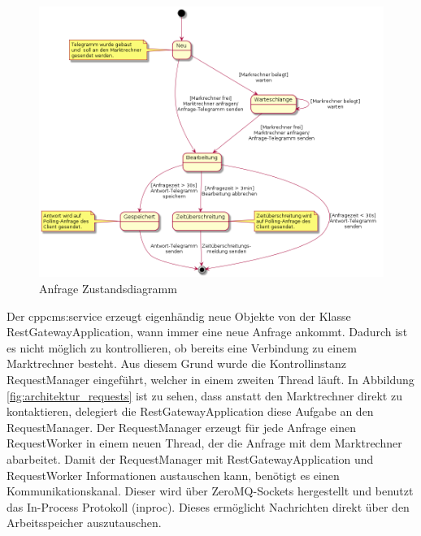 \documentclass{article}
\begin{document}
\begin{figure}[h]
\centering
\includegraphics[scale=0.4]{praktikumsbericht_002.png}
\caption{Anfrage Zustandsdiagramm}
\label{fig:request_state}
\end{figure}

Der cppcms:service erzeugt eigenhändig neue Objekte von der Klasse RestGatewayApplication, wann immer eine neue Anfrage ankommt. Dadurch ist es nicht möglich zu kontrollieren, ob bereits eine Verbindung zu einem Marktrechner besteht. Aus diesem Grund wurde die Kontrollinstanz RequestManager eingeführt, welcher in einem zweiten Thread läuft. In Abbildung \ref{fig:architektur_requests} ist zu sehen, dass anstatt den Marktrechner direkt zu kontaktieren, delegiert die RestGatewayApplication diese Aufgabe an den RequestManager. Der RequestManager erzeugt für jede Anfrage einen RequestWorker in einem neuen Thread, der die Anfrage mit dem Marktrechner abarbeitet. Damit der RequestManager mit RestGatewayApplication und RequestWorker Informationen austauschen kann, benötigt es einen Kommunikationskanal. Dieser wird über ZeroMQ-Sockets hergestellt und benutzt das In-Process Protokoll (inproc). Dieses ermöglicht Nachrichten direkt über den Arbeitsspeicher auszutauschen. 
\end{document}
